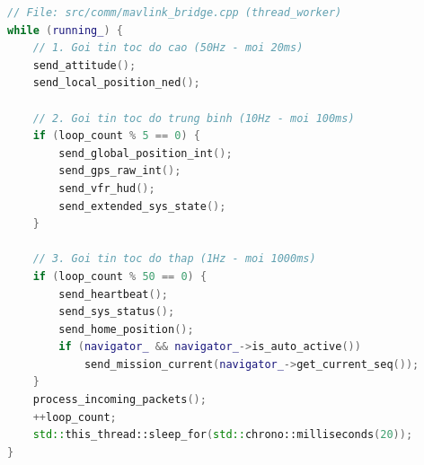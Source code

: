 \documentclass[11pt,a4paper]{article}
\begin{document}
\begin{minipage}[t]{0.52\textwidth}
\vspace{0pt}
\begin{lstlisting}[language=C++, firstnumber=1108]
// File: src/comm/mavlink_bridge.cpp (thread_worker)
while (running_) {
    // 1. Goi tin toc do cao (50Hz - moi 20ms)
    send_attitude();
    send_local_position_ned();

    // 2. Goi tin toc do trung binh (10Hz - moi 100ms)
    if (loop_count % 5 == 0) {
        send_global_position_int();
        send_gps_raw_int();
        send_vfr_hud();
        send_extended_sys_state();
    }

    // 3. Goi tin toc do thap (1Hz - moi 1000ms)
    if (loop_count % 50 == 0) {
        send_heartbeat();
        send_sys_status();
        send_home_position();
        if (navigator_ && navigator_->is_auto_active())
            send_mission_current(navigator_->get_current_seq());
    }
    process_incoming_packets();
    ++loop_count;
    std::this_thread::sleep_for(std::chrono::milliseconds(20));
}
\end{lstlisting}
\end{minipage}

\vspace{1em}
\end{document}
